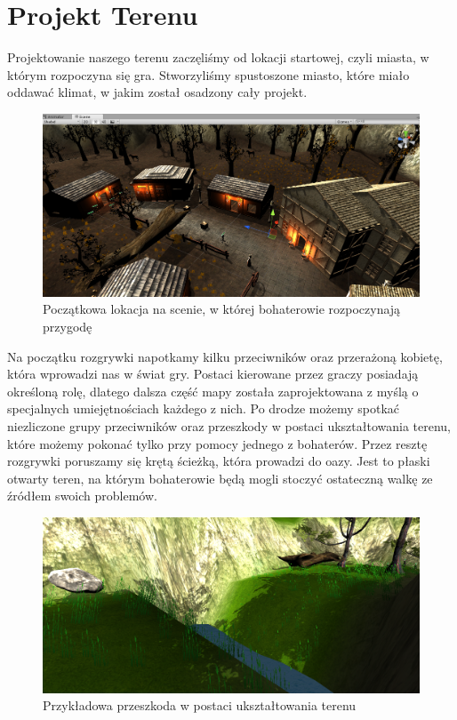 \documentclass[openright]{xmgr}
\begin{document}
    \section{Projekt Terenu}
        Projektowanie naszego terenu zaczęliśmy od lokacji startowej, czyli miasta, w którym rozpoczyna się gra. 
        Stworzyliśmy spustoszone miasto, które miało oddawać klimat, w jakim został osadzony cały projekt. 
        \begin{figure}[H]
            \center
            \includegraphics[width=\textwidth]{scena.png}
            \caption{Początkowa lokacja na scenie, w której bohaterowie rozpoczynają przygodę}
        \end{figure}
        Na początku rozgrywki napotkamy kilku przeciwników oraz przerażoną kobietę, która wprowadzi nas w świat gry.  
        Postaci kierowane przez graczy posiadają określoną rolę, dlatego dalsza część mapy została zaprojektowana z myślą o specjalnych umiejętnościach każdego z nich.
        Po drodze możemy spotkać niezliczone grupy przeciwników oraz przeszkody w postaci ukształtowania terenu, które możemy pokonać tylko przy pomocy jednego z bohaterów.
        Przez resztę rozgrywki poruszamy się krętą ścieżką, która prowadzi do oazy.
        Jest to płaski otwarty teren, na którym bohaterowie będą mogli stoczyć ostateczną walkę ze źródłem swoich problemów.
        \begin{figure}[H]
            \center
            \includegraphics[width=\textwidth]{scena2.png}
            \caption{Przykładowa przeszkoda w postaci ukształtowania terenu}
        \end{figure}
  
\end{document}
